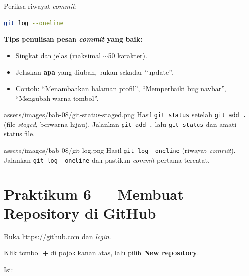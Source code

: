 \begin{langkah}
  \item Periksa riwayat \emph{commit}:
\end{langkah}

\begin{lstlisting}[language=bash, caption={Melihat riwayat commit}, label={lst:git-log}]
git log --oneline
\end{lstlisting}

\begin{tip}
\textbf{Tips penulisan pesan \emph{commit} yang baik:}
\begin{itemize}
  \item Singkat dan jelas (maksimal $\sim$50 karakter).
  \item Jelaskan \textbf{apa} yang diubah, bukan sekadar ``update''.
  \item Contoh: ``Menambahkan halaman profil'', ``Memperbaiki bug navbar'', ``Mengubah warna tombol''.
\end{itemize}
\end{tip}

\begin{tangkapanlayar}
  {assets/images/bab-08/git-status-staged.png}
  {Hasil \texttt{git status} setelah \texttt{git add .} (file \emph{staged}, berwarna hijau).}
  {Jalankan \texttt{git add .} lalu \texttt{git status} dan amati status file.}
\end{tangkapanlayar}

\begin{tangkapanlayar}
  {assets/images/bab-08/git-log.png}
  {Hasil \texttt{git log --oneline} (riwayat \emph{commit}).}
  {Jalankan \texttt{git log --oneline} dan pastikan \emph{commit} pertama tercatat.}
\end{tangkapanlayar}

\section{Praktikum 6 --- Membuat Repository di GitHub}
\label{sec:git-praktik-6}

\begin{langkah}
  \item Buka \url{https://github.com} dan \emph{login}.
  \item Klik tombol \textbf{+} di pojok kanan atas, lalu pilih \textbf{New repository}.
  \item Isi:
\end{langkah}

